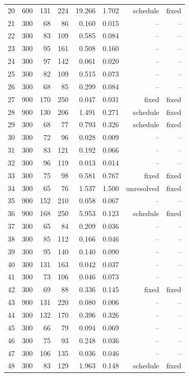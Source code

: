 \begin{longtable}{rrrrrrrr}
20 & 600 & 131 & 224 & 19.266 & 1.702 & schedule & fixed \\
21 & 300 & 68 & 86 & 0.160 & 0.015 & -- & -- \\
22 & 300 & 83 & 109 & 0.585 & 0.084 & -- & -- \\
23 & 300 & 95 & 161 & 0.508 & 0.160 & -- & -- \\
24 & 300 & 97 & 142 & 0.061 & 0.020 & -- & -- \\
25 & 300 & 82 & 109 & 0.515 & 0.073 & -- & -- \\
26 & 300 & 68 & 85 & 0.299 & 0.084 & -- & -- \\
27 & 900 & 170 & 250 & 0.047 & 0.031 & fixed & fixed \\
28 & 900 & 130 & 206 & 1.491 & 0.271 & schedule & fixed \\
29 & 300 & 68 & 77 & 0.793 & 0.326 & schedule & fixed \\
30 & 300 & 72 & 96 & 0.028 & 0.009 & -- & -- \\
31 & 300 & 83 & 121 & 0.192 & 0.066 & -- & -- \\
32 & 300 & 96 & 119 & 0.013 & 0.014 & -- & -- \\
33 & 300 & 75 & 98 & 0.581 & 0.767 & fixed & fixed \\
34 & 300 & 65 & 76 & 1.537 & 1.500 & unresolved & fixed \\
35 & 900 & 152 & 210 & 0.058 & 0.067 & -- & -- \\
36 & 900 & 168 & 250 & 5.953 & 0.123 & schedule & fixed \\
37 & 300 & 65 & 84 & 0.209 & 0.036 & -- & -- \\
38 & 300 & 85 & 112 & 0.166 & 0.046 & -- & -- \\
39 & 300 & 95 & 140 & 0.140 & 0.090 & -- & -- \\
40 & 300 & 131 & 163 & 0.042 & 0.037 & -- & -- \\
41 & 300 & 73 & 106 & 0.046 & 0.073 & -- & -- \\
42 & 300 & 69 & 88 & 0.336 & 0.145 & fixed & fixed \\
43 & 900 & 131 & 220 & 0.080 & 0.006 & -- & -- \\
44 & 300 & 132 & 170 & 0.396 & 0.326 & -- & -- \\
45 & 300 & 66 & 79 & 0.094 & 0.069 & -- & -- \\
46 & 300 & 75 & 93 & 0.248 & 0.036 & -- & -- \\
47 & 300 & 106 & 135 & 0.036 & 0.046 & -- & -- \\
48 & 300 & 83 & 129 & 1.963 & 0.148 & schedule & fixed \\

\end{longtable}
